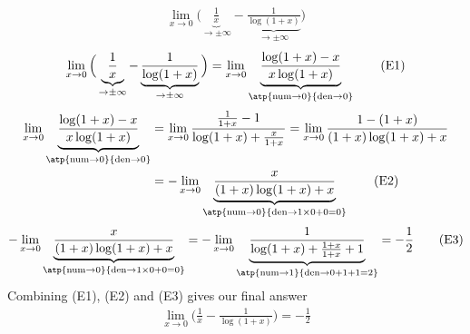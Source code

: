 \begin{eg}\label{eg:hopitalKK}
\begin{align*}
\lim_{x\rightarrow 0}\Big(
\underbrace{\frac{1}{x}}_{\rightarrow \pm\infty}
- \underbrace{\frac{1}{\log(1+x)}}_{\rightarrow\pm\infty}\Big)
\end{align*}
\begin{equation}
\lim_{x\rightarrow 0}\Big(
\underbrace{\frac{1}{x}}_{\rightarrow \pm\infty}
- \underbrace{\frac{1}{\log(1+x)}}_{\rightarrow\pm\infty}\Big)
=\lim_{x\rightarrow 0}\underbrace{\frac{\log(1+x)-x}{x\log(1+x)}}_{\atp
{\mathrm{num}\rightarrow 0}
{\mathrm{den}\rightarrow 0}}
\tag{E1}
\end{equation}
\begin{align}
\lim_{x\rightarrow 0}\underbrace{\frac{\log(1+x)-x}{x\log(1+x)}}_{\atp
{\mathrm{num}\rightarrow 0}
{\mathrm{den}\rightarrow 0}}
&=\lim_{x\rightarrow 0}\frac{\frac{1}{1+x}-1} {\log(1+x)+\frac{x}{1+x}}
=\lim_{x\rightarrow 0}\frac{1-(1+x)} {(1+x)\log(1+x)+x}\notag\\
&=-\lim_{x\rightarrow 0}\underbrace{\frac{x} {(1+x)\log(1+x)+x}}_{\atp
{\mathrm{num}\rightarrow 0}
{\mathrm{den}\rightarrow 1\times 0+0=0}} \tag{E2}
\end{align}
\begin{equation}
-\lim_{x\rightarrow 0}\underbrace{\frac{x} {(1+x)\log(1+x)+x}}_{\atp
{\mathrm{num}\rightarrow 0}
{\mathrm{den}\rightarrow 1\times 0+0=0}}
=-\lim_{x\rightarrow 0}\underbrace{\frac{1} {\log(1+x)+\frac{1+x}{1+x}+1}}_{\atp
{\mathrm{num}\rightarrow 1}
{\mathrm{den}\rightarrow 0+1+1=2}}
=-\frac{1}{2}
\tag{E3}
\end{equation}
Combining (E1), (E2) and (E3) gives our final answer
\begin{align*}
\lim_{x\rightarrow 0}\Big(\frac{1}{x} - \frac{1}{\log(1+x)}\Big)=-\frac{1}{2}
\end{align*}
\end{eg}
